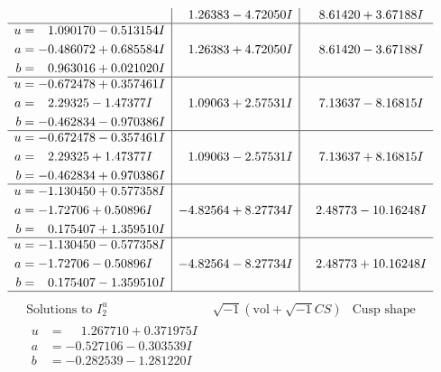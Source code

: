 \documentclass[1p]{elsarticle_modified}
\theoremstyle{definition}
\newcommand{\I}{\sqrt{-1}}
\begin{document}
$$\begin{array}{c|c|c}
 & \phantom{-}1.26383 - 4.72050 I & \phantom{-}8.61420 + 3.67188 I \\ \hline\begin{aligned}
u &= \phantom{-}1.090170 - 0.513154 I \\
a &= -0.486072 + 0.685584 I \\
b &= \phantom{-}0.963016 + 0.021020 I\end{aligned}
 & \phantom{-}1.26383 + 4.72050 I & \phantom{-}8.61420 - 3.67188 I \\ \hline\begin{aligned}
u &= -0.672478 + 0.357461 I \\
a &= \phantom{-}2.29325 - 1.47377 I \\
b &= -0.462834 - 0.970386 I\end{aligned}
 & \phantom{-}1.09063 + 2.57531 I & \phantom{-}7.13637 - 8.16815 I \\ \hline\begin{aligned}
u &= -0.672478 - 0.357461 I \\
a &= \phantom{-}2.29325 + 1.47377 I \\
b &= -0.462834 + 0.970386 I\end{aligned}
 & \phantom{-}1.09063 - 2.57531 I & \phantom{-}7.13637 + 8.16815 I \\ \hline\begin{aligned}
u &= -1.130450 + 0.577358 I \\
a &= -1.72706 + 0.50896 I \\
b &= \phantom{-}0.175407 + 1.359510 I\end{aligned}
 & -4.82564 + 8.27734 I & \phantom{-}2.48773 - 10.16248 I \\ \hline\begin{aligned}
u &= -1.130450 - 0.577358 I \\
a &= -1.72706 - 0.50896 I \\
b &= \phantom{-}0.175407 - 1.359510 I\end{aligned}
 & -4.82564 - 8.27734 I & \phantom{-}2.48773 + 10.16248 I\\
 \hline 
 \end{array}$$\newpage$$\begin{array}{c|c|c}  
\text{Solutions to }I^u_{2}& \I (\text{vol} + \sqrt{-1}CS) & \text{Cusp shape}\\
 \hline 
\begin{aligned}
u &= \phantom{-}1.267710 + 0.371975 I \\
a &= -0.527106 - 0.303539 I \\
b &= -0.282539 - 1.281220 I\end{aligned}

\end{array}$$
\end{document}
